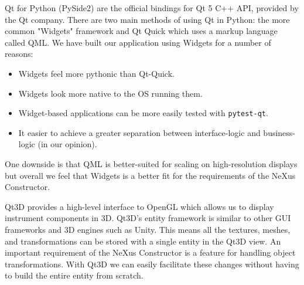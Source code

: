 Qt for Python (PySide2) are the official bindings for Qt 5 C++ API, provided by the Qt company. There are two main methods of using Qt in Python: the more common "Widgets" framework and Qt Quick which uses a markup language called QML. We have built our application using Widgets for a number of reasons: 
\begin{itemize}
\item Widgets feel more pythonic than Qt-Quick.
\item Widgets look more native to the OS running them.
\item Widget-based applications can be more easily tested with \texttt{pytest-qt}.
\item It easier to achieve a greater separation between interface-logic and business-logic (in our opinion).
\end{itemize}

One downside is that QML is better-suited for scaling on high-resolution displays but overall we feel that Widgets is a better fit for the requirements of the NeXus Constructor.

Qt3D provides a high-level interface to OpenGL which allows us to display instrument components in 3D. Qt3D's entity framework is similar to other GUI frameworks and 3D engines such as Unity. This means all the textures, meshes, and transformations can be stored with a single entity in the Qt3D view. An important requirement of the NeXus Constructor is a feature for handling object transformations. With Qt3D we can easily facilitate these changes without having to build the entire entity from scratch. 
\iffalse
\bigskip
The code snippet below shows the usage of a typical Qt3D view in python. Qt3D provides some high-level geometry types for adding cylinders, meshes, spheres as well as several other shapes. This is all wrapping OpenGL, and in the future Qt have stated they will support other graphics engines such as DirectX12, Vulkan and Metal. Currently there is some limited support for vulkan using the QVulkanWindow with a QVulkanInstance.
\fi
